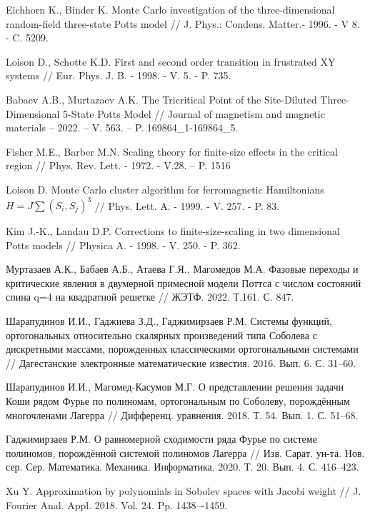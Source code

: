 \begin{thebibliography}{111}
Eichhorn K., Binder K. Monte Carlo investigation of the three-dimensional random-field three-state Potts model // J. Phys.: Condens. Matter.- 1996. - V 8. - C. 5209.

Loison D., Schotte K.D. First and second order transition in frustrated XY systems // Eur. Phys. J. B. - 1998. - V. 5. - P. 735.

Babaev A.B., Murtazaev A.K. The Tricritical Point of the Site-Diluted Three-Dimensional 5-State Potts Model // Journal of magnetism and magnetic materials -- 2022. -- V. 563. -- P. 169864\_1-169864\_5.

Fisher M.E., Barber M.N. Scaling theory for finite-size effects in the critical region // Phys. Rev. Lett. - 1972. - V.28. -- P. 1516

Loison D. Monte Carlo cluster algorithm for ferromagnetic Hamiltonians $H = J\sum(S_i, S_j)^3$ // Phys. Lett. A. - 1999. - V. 257. - P. 83.

Kim J.-K., Landau D.P. Corrections to finite-size-scaling in two dimensional Potts models // Physica A. - 1998. - V. 250. - P. 362.

Муртазаев А.К., Бабаев А.Б., Атаева Г.Я., Магомедов М.А. Фазовые переходы и критические явления в двумерной примесной модели Поттса с числом состояний спина q=4 на квадратной решетке // ЖЭТФ. 2022. Т.161. С. 847.


{Шарапудинов И.И., Гаджиева З.Д., Гаджимирзаев Р.М.} Системы функций, ортогональных относительно скалярных произведений типа Соболева с дискретными массами, порожденных классическими ортогональными системами // Дагестанские электронные математические известия. 2016. Вып. 6. С. 31--60.

{Шарапудинов И.И., Магомед-Касумов М.Г.} О представлении решения задачи Коши рядом Фурье по полиномам, ортогональным по Соболеву, порождённым многочленами Лагерра // Дифференц. уравнения. 2018. Т. 54. Вып. 1. С. 51--68.

{Гаджимирзаев Р.М.} О равномерной сходимости ряда Фурье по системе полиномов, порождённой системой полиномов Лагерра // Изв. Сарат. ун-та. Нов. сер. Сер. Математика. Механика. Информатика. 2020. Т. 20. Вып. 4. С. 416--423.


{Xu Y.} Approximation by polynomials in Sobolev spaces with Jacobi weight // J. Fourier Anal. Appl. 2018. Vol. 24. Pp. 1438–-1459.



\end{thebibliography}
